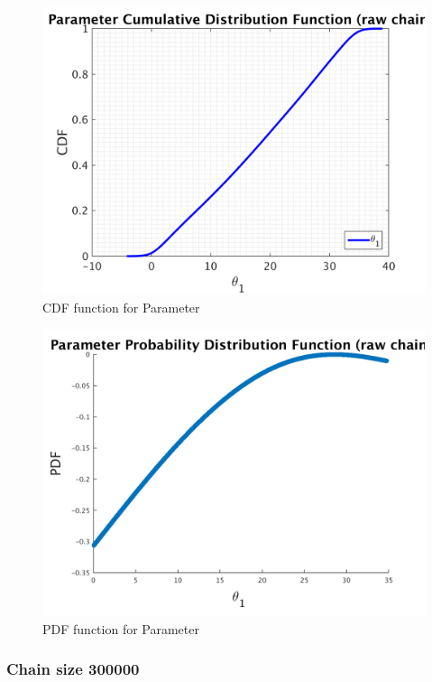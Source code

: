 \begin{figure}[h!]
  
  \centering
   \includegraphics[scale=0.75]{output_100000/simple_ip_cdf_raw}
   \caption{CDF function for Parameter }
\end{figure}



\begin{figure}[h!]
  
  \centering
   \includegraphics[scale=0.75]{output_100000/ip_logLike_unified}
   \caption{PDF function for Parameter }
\end{figure}


\subsubsection{Chain size 300000 }

